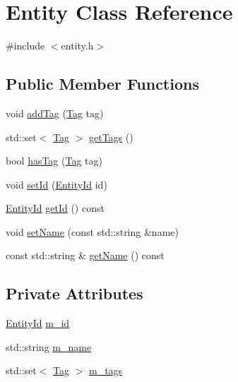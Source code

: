 \hypertarget{classEntity}{\section{Entity Class Reference}
\label{classEntity}
}


{\ttfamily \#include $<$entity.\-h$>$}

\subsection*{Public Member Functions}
\begin{DoxyCompactItemize}
\item 
void \hyperlink{classEntity_a133b2415227ddcd227cb5f287cc43103}{add\-Tag} (\hyperlink{entity_8h_a305263dd89ad9fde1863aece00907351}{Tag} tag)
\item 
std\-::set$<$ \hyperlink{entity_8h_a305263dd89ad9fde1863aece00907351}{Tag} $>$ \hyperlink{classEntity_a6fc308a723e369bc66608b6c456de31f}{get\-Tags} ()
\item 
bool \hyperlink{classEntity_a34a9112d28e1192137f672893c55a2c7}{has\-Tag} (\hyperlink{entity_8h_a305263dd89ad9fde1863aece00907351}{Tag} tag)
\item 
void \hyperlink{classEntity_a8ce04051a248625ce653260e0e706799}{set\-Id} (\hyperlink{entity_8h_a3812b46f7256476cf244cbc0f4a3bde9}{Entity\-Id} id)
\item 
\hyperlink{entity_8h_a3812b46f7256476cf244cbc0f4a3bde9}{Entity\-Id} \hyperlink{classEntity_a66a967740faf35f7fcece11e9e65e344}{get\-Id} () const 
\item 
void \hyperlink{classEntity_a2272426be85933edb3243cd50def65d1}{set\-Name} (const std\-::string \&name)
\item 
const std\-::string \& \hyperlink{classEntity_a34a6186465703be860fe32f44208619a}{get\-Name} () const 
\end{DoxyCompactItemize}
\subsection*{Private Attributes}
\begin{DoxyCompactItemize}
\item 
\hyperlink{entity_8h_a3812b46f7256476cf244cbc0f4a3bde9}{Entity\-Id} \hyperlink{classEntity_a3dd68bb3258dd9ed2c878712b08a523b}{m\-\_\-id}
\item 
std\-::string \hyperlink{classEntity_a4b945ebe36bda22cc9cc7c6620f43d51}{m\-\_\-name}
\item 
std\-::set$<$ \hyperlink{entity_8h_a305263dd89ad9fde1863aece00907351}{Tag} $>$ \hyperlink{classEntity_afb554fadb21bb5bc9cf51633373a387a}{m\-\_\-tags}
\end{DoxyCompactItemize}
